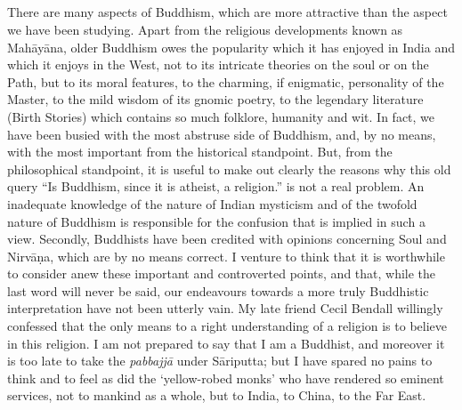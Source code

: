 \documentclass[a4paper, 11pt, oneside, english, landscape]{article}
\begin{document}
\subsection{}
\paragraph{}
There are many aspects of Buddhism, which are more attractive than the aspect we have been studying. Apart from the religious developments known as Mahāyāna, older Buddhism owes the popularity which it has enjoyed in India and which it enjoys in the West, not to its intricate theories on the soul or on the Path, but to its moral features, to the charming, if enigmatic, personality of the Master, to the mild wisdom of its gnomic poetry, to the legendary literature (Birth Stories) which contains so much folklore, humanity and wit. In fact, we have been busied with the most abstruse side of Buddhism, and, by no means, with the most important from the historical standpoint. But, from the philosophical standpoint, it is useful to make out clearly the reasons why this old query ``Is Buddhism, since it is atheist, a religion.'' is not a real problem. An inadequate knowledge of the nature of Indian mysticism and of the twofold nature of Buddhism is responsible for the confusion that is implied in such a view. Secondly, Buddhists have been credited with opinions concerning Soul and Nirvāṇa, which are by no means correct. I venture to think that it is worthwhile to consider anew these important and controverted points, and that, while the last word will never be said, our endeavours towards a more truly Buddhistic interpretation have not been utterly vain. My late friend Cecil Bendall willingly confessed that the only means to a right understanding of a religion is to believe in this religion. I am not prepared to say that I am a Buddhist, and moreover it is too late to take the \emph{pabbajjā} under Sāriputta; but I have spared no pains to think and to feel as did the `yellow-robed monks' who have rendered so eminent services, not to mankind as a whole, but to India, to China, to the Far East.
\clearpage
\end{document}
